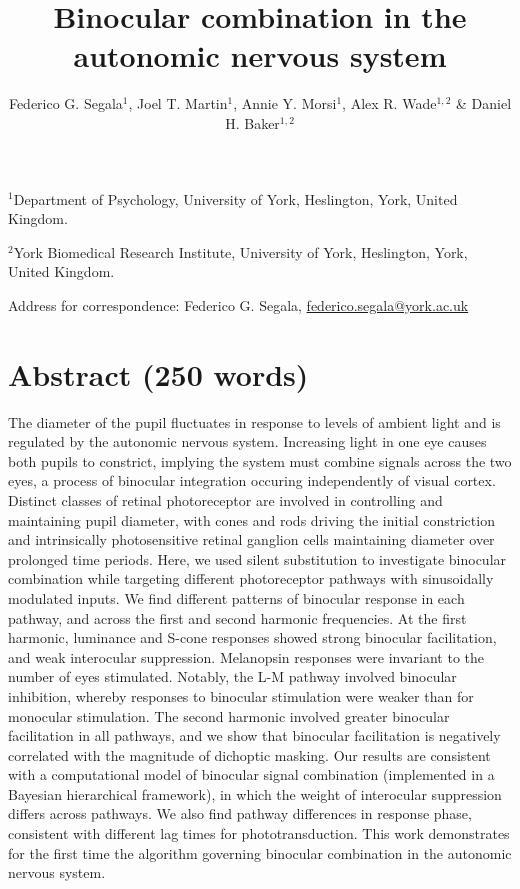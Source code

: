 \documentclass[
]{article}
\title{Binocular combination in the autonomic nervous system}
\author{Federico G. Segala\(^1\), Joel T. Martin\(^1\), Annie Y. Morsi\(^1\), Alex R. Wade\(^{1,2}\) \& Daniel H. Baker\(^{1,2}\)}
\date{}
\begin{document}
\maketitle

\(^1\)Department of Psychology, University of York, Heslington, York, United Kingdom.

\(^2\)York Biomedical Research Institute, University of York, Heslington, York, United Kingdom.

Address for correspondence: Federico G. Segala, \url{federico.segala@york.ac.uk}

\hypertarget{abstract-250-words}{%
\section{Abstract (250 words)}\label{abstract-250-words}}

The diameter of the pupil fluctuates in response to levels of ambient light and is regulated by the autonomic nervous system. Increasing light in one eye causes both pupils to constrict, implying the system must combine signals across the two eyes, a process of binocular integration occuring independently of visual cortex. Distinct classes of retinal photoreceptor are involved in controlling and maintaining pupil diameter, with cones and rods driving the initial constriction and intrinsically photosensitive retinal ganglion cells maintaining diameter over prolonged time periods. Here, we used silent substitution to investigate binocular combination while targeting different photoreceptor pathways with sinusoidally modulated inputs. We find different patterns of binocular response in each pathway, and across the first and second harmonic frequencies. At the first harmonic, luminance and S-cone responses showed strong binocular facilitation, and weak interocular suppression. Melanopsin responses were invariant to the number of eyes stimulated. Notably, the L-M pathway involved binocular inhibition, whereby responses to binocular stimulation were weaker than for monocular stimulation. The second harmonic involved greater binocular facilitation in all pathways, and we show that binocular facilitation is negatively correlated with the magnitude of dichoptic masking. Our results are consistent with a computational model of binocular signal combination (implemented in a Bayesian hierarchical framework), in which the weight of interocular suppression differs across pathways. We also find pathway differences in response phase, consistent with different lag times for phototransduction. This work demonstrates for the first time the algorithm governing binocular combination in the autonomic nervous system.
\end{document}
